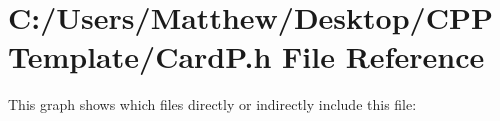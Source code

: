 \section{C\+:/\+Users/\+Matthew/\+Desktop/\+C\+P\+P\+Template/\+CardP.h File Reference}
\label{_card_p_8h}
This graph shows which files directly or indirectly include this file\+:
